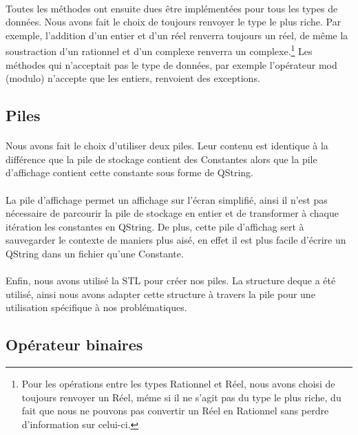 \documentclass[a4paper,12pt]{article}
\begin{document}
		\paragraph{}Toutes les méthodes ont ensuite dues être implémentées pour tous les types de données. Nous avons fait le choix de toujours renvoyer le type le plus riche. Par exemple, l'addition d'un entier et d'un réel renverra toujours un réel, de même la soustraction d'un rationnel et d'un complexe renverra un complexe.\footnote{Pour les opérations entre les types Rationnel et Réel, nous avons choisi de toujours renvoyer un Réel, méme si il ne s'agit pas du type le plus riche, du fait que nous ne pouvons pas convertir un Réel en Rationnel sans perdre d'information sur celui-ci.} Les méthodes qui n'acceptait pas le type de données, par exemple l'opérateur mod (modulo) n'accepte que les entiers, renvoient des exceptions.

	\subsection{Piles}
		\paragraph{}Nous avons fait le choix d'utiliser deux piles. Leur contenu est identique à la différence que la pile de stockage contient des Constantes alors que la pile d’affichage contient cette constante sous forme de QString.
		
		\paragraph{}La pile d’affichage permet un affichage sur l’écran simplifié, ainsi il n'est pas nécessaire de parcourir la pile de stockage en entier et de transformer à chaque itération les constantes en QString. De plus, cette pile d'affichag sert à sauvegarder le contexte de maniers plus aisé, en effet il est plus facile d'écrire un QString dans un fichier qu'une Constante.
		
		\paragraph{}Enfin, nous avons utilisé la STL pour créer nos piles. La structure deque a été utilisé, ainsi nous avons adapter cette structure à travers la pile pour une utilisation spécifique à nos problématiques.
		
	\subsection{Opérateur binaires}
\end{document}

